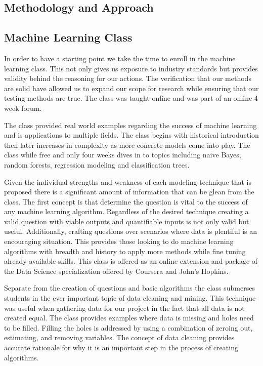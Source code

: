 \documentclass[paper=letter, fontsize=11pt]{scrartcl}
\numberwithin{equation}{section}		%
\numberwithin{figure}{section}			%
\numberwithin{table}{section}				%
\begin{document}
\begin{spacing}{2}
\section{Methodology and Approach}
\subsection{Machine Learning Class}
In order to have a starting point we take the time to enroll in the machine learning class.\cite{class} This not only gives us exposure to industry standards but provides validity behind the reasoning for our actions. The verification that our methods are solid have allowed us to expand our scope for research while ensuring that our testing methods are true. The class was taught online and was part of an online 4 week forum.

The class provided real world examples regarding the success of machine learning and is applications to multiple fields. The class begins with historical introduction then later increases in complexity as more concrete models come into play. The class while free and only four weeks dives in to topics including naive Bayes, random forests, regression modeling and classification trees. 

Given the individual strengths and weakness of each modeling technique that is proposed there is a significant amount of information that can be glean from the class. The first concept is that determine the question is vital to the success of any machine learning algorithm. Regardless of the desired technique creating a valid question with viable outputs and quantifiable inputs is not only valid but useful. Additionally, crafting questions over scenarios where data is plentiful is an encouraging situation. This provides those looking to do machine learning algorithms with breadth and history to apply more methods while fine tuning already available skills. This class is offered as an online extension and package of the Data Science specialization offered by Coursera and John's Hopkins. 

Separate from the creation of questions and basic algorithms the class submerses students in the ever important topic of data cleaning and mining. This technique was useful when gathering data for our project in the fact that all data is not created equal. The class provides examples where data is missing and holes need to be filled. Filling the holes is addressed by using a combination of zeroing out, estimating, and removing variables. The concept of data cleaning provides accurate rationale for why it is an important step in the process of creating algorithms. 


\end{spacing}
\end{document}
